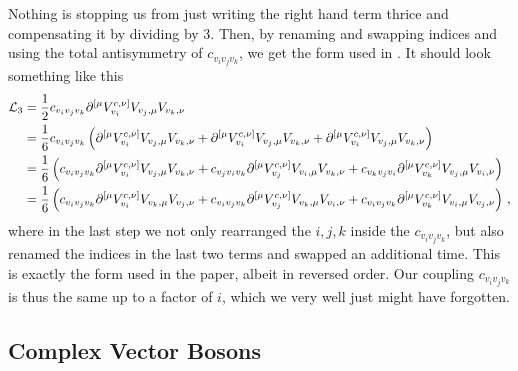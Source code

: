 Nothing is stopping us from just writing the right hand term thrice and compensating it by dividing by 3.
Then, by renaming and swapping indices and using the total antisymmetry of $c_{v_i v_j v_k}$, we get the form used in \cite{penguin}.
It should look something like this
\begin{align*}
    \mathcal{L}_3 &= \frac{1}{2}c_{v_i v_j v_k} \partial_{\vphantom{v_i}}^{[\mu} V_{v_i}^{c,\nu]} V_{v_j, \mu} V_{v_k, \nu} \\
                  &= \frac{1}{6}c_{v_i v_j v_k} \left( \partial_{\vphantom{v_i}}^{[\mu} V_{v_i}^{c,\nu]} V_{v_j, \mu} V_{v_k, \nu} 
                    + \partial_{\vphantom{v_i}}^{[\mu} V_{v_i}^{c,\nu]} V_{v_j, \mu} V_{v_k, \nu} 
                    + \partial_{\vphantom{v_i}}^{[\mu} V_{v_i}^{c,\nu]} V_{v_j, \mu} V_{v_k, \nu} \right) \\
                  &= \frac{1}{6} \left( c_{v_i v_j v_k} \partial_{\vphantom{v_i}}^{[\mu} V_{v_i}^{c,\nu]} V_{v_j, \mu} V_{v_k, \nu} 
                    + c_{v_j v_i v_k} \partial_{\vphantom{v_j}}^{[\mu} V_{v_j}^{c,\nu]} V_{v_i, \mu} V_{v_k, \nu} 
                    + c_{v_k v_j v_i} \partial_{\vphantom{v_k}}^{[\mu} V_{v_k}^{c,\nu]} V_{v_j, \mu} V_{v_i, \nu} \right) \\
                  &= \frac{1}{6} \left( c_{v_i v_j v_k} \partial_{\vphantom{v_i}}^{[\mu} V_{v_i}^{c,\nu]} V_{v_k, \mu} V_{v_j, \nu} 
                    + c_{v_i v_j v_k} \partial_{\vphantom{v_j}}^{[\mu} V_{v_j}^{c,\nu]} V_{v_k, \mu} V_{v_i, \nu} 
                    + c_{v_i v_j v_k} \partial_{\vphantom{v_k}}^{[\mu} V_{v_k}^{c,\nu]} V_{v_i, \mu} V_{v_j, \nu} \right) \,, \\
\end{align*}
where in the last step we not only rearranged the $i,j,k$ inside the $c_{v_i v_j v_k}$, but also renamed the indices in the last two terms 
and swapped an additional time. This is exactly the form used in the paper, albeit in reversed order.
Our coupling $c_{v_i v_j v_k}$ is thus the same up to a factor of $i$, which we very well just might have forgotten.


\subsection{Complex Vector Bosons}

